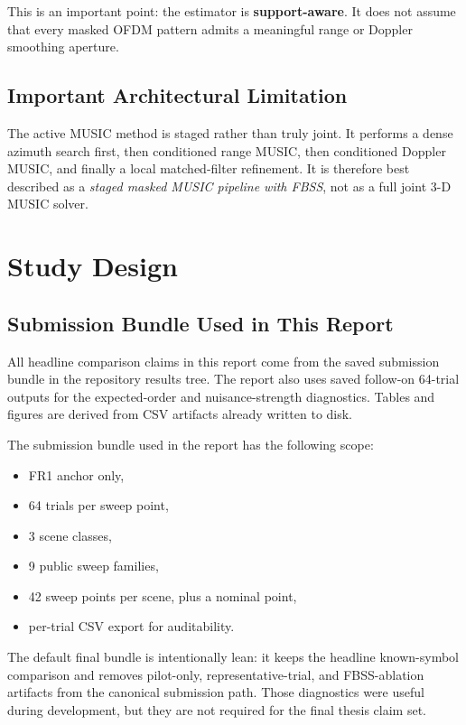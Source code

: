 \documentclass[11pt]{article}
\begin{document}
This is an important point: the estimator is \textbf{support-aware}. It does not assume that every masked OFDM pattern admits a meaningful range or Doppler smoothing aperture.

\subsection{Important Architectural Limitation}

The active MUSIC method is staged rather than truly joint. It performs a dense azimuth search first, then conditioned range MUSIC, then conditioned Doppler MUSIC, and finally a local matched-filter refinement. It is therefore best described as a \emph{staged masked MUSIC pipeline with FBSS}, not as a full joint 3-D MUSIC solver.

\section{Study Design}

\subsection{Submission Bundle Used in This Report}

All headline comparison claims in this report come from the saved submission bundle in the repository results tree. The report also uses saved follow-on 64-trial outputs for the expected-order and nuisance-strength diagnostics. Tables and figures are derived from CSV artifacts already written to disk.

The submission bundle used in the report has the following scope:
\begin{itemize}
  \item FR1 anchor only,
  \item 64 trials per sweep point,
  \item 3 scene classes,
  \item 9 public sweep families,
  \item 42 sweep points per scene, plus a nominal point,
  \item per-trial CSV export for auditability.
\end{itemize}

The default final bundle is intentionally lean: it keeps the headline known-symbol comparison and removes pilot-only, representative-trial, and FBSS-ablation artifacts from the canonical submission path. Those diagnostics were useful during development, but they are not required for the final thesis claim set.
\end{document}
